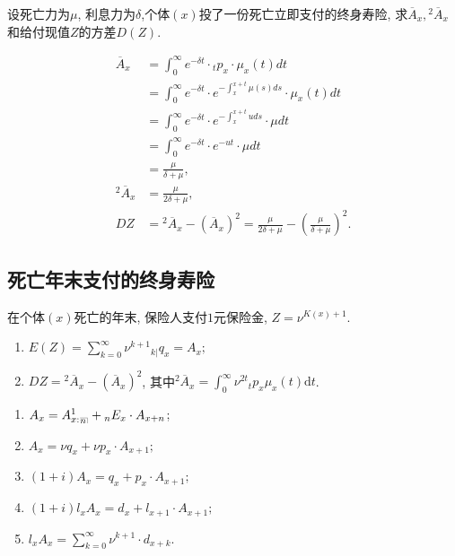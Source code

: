 \documentclass[lang=cn,10pt]{elegantbook}
\makeatletter
\DeclareRobustCommand{\annu}[1]{_{%
    \def\arraystretch{0}%
    \setlength\arraycolsep{1pt}%
    \setlength\arrayrulewidth{.2pt}%
    \begin{array}[b]{@{}c|}\hline
        \\[\arraycolsep]%
        \scriptstyle #1%
    \end{array}%
}}
\makeatother
\begin{document}
\begin{example}
    设死亡力为$\mu$, 利息力为$\delta$,个体$(x)$投了一份死亡立即支付的终身寿险, 求$\overline{A}_{x}, {}^2\overline{A}_{x} $和给付现值$Z$的方差$D(Z)$.
\end{example}
    \begin{solution}
    \begin{align*}
        \overline{A}_{x}     & =\int_0^{\infty}e^{-\delta t}\cdot {}_tp_x\cdot \mu_x(t)dt \\
        & =\int_0^{\infty}e^{-\delta t}\cdot e^{-\int_x^{x+t}\mu(s)ds}\cdot \mu_x(t)dt \\
        & =\int_0^{\infty}e^{-\delta t}\cdot e^{-\int_x^{x+t}uds}\cdot \mu dt    \\
        & =\int_0^{\infty}e^{-\delta t}\cdot e^{-ut}\cdot \mu dt \\
        & =\frac{\mu}{\delta +\mu}, \\
        {}^2\overline{A}_{x} 
		& =\frac{\mu}{2\delta +\mu}, \\
        DZ & ={}^2\overline{A}_{x}-(\overline{A}_{x})^2=\frac{\mu}{2\delta +\mu}-(\frac{\mu}{\delta +\mu})^2.
    \end{align*}
\end{solution}

\subsection{死亡年末支付的终身寿险}
\begin{definition}[支付现值]
	在个体$(x)$死亡的年末, 保险人支付$1$元保险金, $Z=\nu^{K(x)+1}$.
\end{definition}

\begin{proposition}[精算现值与方差]
	\begin{enumerate}
		\item $E(Z) = \sum_{k=0}^{\infty }{\nu^{k+1}{}_{k|}q_x} = A_x;$
		\item $DZ = {}^2\overline{A}_x - (\overline{A}_x)^2$, 其中${}^2\overline{A}_x = \int_0^\infty \nu^{2t}{}_tp_x\mu_x(t)\mathrm{d}t$.
	\end{enumerate}
\end{proposition}

\begin{corollary}[精算现值的性质]
	\begin{enumerate}
		\item ${A}_x = {A}_{x:}^1{}_{\annu{n}} + {}_nE_{x}\cdot {A}_{x+n}$;
		\item ${A}_x = \nu q_x + \nu p_x\cdot {A}_{x+1};$
		\item $(1+i){A}_x = q_x + p_x\cdot {A}_{x+1};$
		\item $(1+i)l_x{A}_x = d_x + l_{x+1}\cdot {A}_{x+1};$
		\item $l_x{A}_x = \sum_{k=0}^{\infty }{\nu^{k+1}\cdot d_{x+k}}.$
	\end{enumerate}
\end{corollary}
\end{document}
